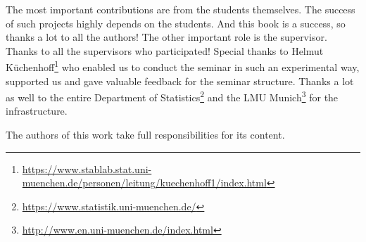 \documentclass[
]{krantz}
\renewcommand{\href}[2]{#2\footnote{\url{#1}}}
\begin{document}
The most important contributions are from the students themselves.
The success of such projects highly depends on the students.
And this book is a success, so thanks a lot to all the authors!
The other important role is the supervisor.
Thanks to all the supervisors who participated!
Special thanks to \href{https://www.stablab.stat.uni-muenchen.de/personen/leitung/kuechenhoff1/index.html}{Helmut Küchenhoff} who enabled us to conduct the seminar in such an experimental way, supported us and gave valuable feedback for the seminar structure.
Thanks a lot as well to the entire \href{https://www.statistik.uni-muenchen.de/}{Department of Statistics} and the \href{http://www.en.uni-muenchen.de/index.html}{LMU Munich} for the infrastructure.

The authors of this work take full responsibilities for its content.

  

\backmatter
\printindex
\end{document}
